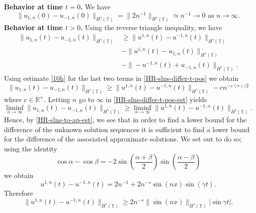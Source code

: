 \documentclass[12pt,reqno]{amsart}
\newcommand{\rr}{\mathbb{R}}
\newcommand{\ci}{\mathbb{T}}
\newcommand{\ee}{\varepsilon}
\theoremstyle{plain}  %
\theoremstyle{definition}
\begin{document}
%
%
%  
%
\vskip0.1in
{\bf Behavior at time $t=0$.}  We have
%
%
\begin{equation} 
	\label{HR-slns-differ-t-0} 
	\|
	u_{1, n}(0)
	-
	u_{-1, n}(0)
	\|_{H^s(\ci)}
	=
	\|
	2   n^{-1}
	\|_{H^s(\ci)}
	\simeq
	n^{-1}
	\longrightarrow 
	0
	\,\,
	\text{as}
	\,\,
	n \to \infty.
\end{equation}
%
%
%  
%
\vskip0.1in
{\bf Behavior at time  $t>0$.}  Using the reverse triangle inequality, we 
have
%
%
%
\begin{equation} 
	\label{HR-slns-differ-t-pos}
	\begin{split}
		\|
		u_{1, n}(t)
		-
		u_{- 1, n}(t)
		\|_{H^s(\ci)}
		&
		\ge
		\|
		u^{1, n}(t)
		-
		u^{- 1, n}(t)
		\|_{H^s(\ci)}
		\\
		&
		-
		\|
		u^{1, n}(t)
		-
		u_{1, n}(t)
		\|_{H^s(\ci)}
		\\
		&
		-
		\|
		-u^{-1, n}(t)
		+
		u_{-1, n}(t)
		\|_{H^s(\ci)} .
	\end{split}
\end{equation}
%
%
Using estimate \eqref{10h} for the last two terms 
in \eqref{HR-slns-differ-t-pos} we obtain
%
%
%
\begin{equation} 
	\label{HR-slns-differ-t-pos-est}
	\|
	u_{1, n}(t)
	-
	u_{- 1, n}(t)
	\|_{H^s(\ci)}
	\ge
	\|
	u^{1, n}(t)
	-
	u^{- 1, n}(t)
	\|_{H^s(\ci)}
	-
	c n^{- \ee(s)/2}
\end{equation}
where $c \in \rr^+$. Letting $n$ go to $\infty$ in
\eqref{HR-slns-differ-t-pos-est}
yields
%
\begin{equation} 
	\label{HR-slns-to-ap-est}
	\liminf_{n\to\infty}
	\|
	u_{1, n}(t)
	-
	u_{- 1, n}(t)
	\|_{H^s(\ci)}
	\ge
	\liminf_{n\to\infty}
	\|
	u^{1, n}(t)
	-
	u^{- 1, n}(t)
	\|_{H^s(\ci)}.
\end{equation}
%
%
Hence, by \eqref{HR-slns-to-ap-est}, we see that in order to find a lower bound for
the difference of the unknown solution sequences it is
sufficient to find a lower bound for the difference of the
associated approximate solutions. We set out to do so; using the identity 
$$
\cos \alpha -\cos \beta
=
-2
\sin(\frac{\alpha + \beta}{2})
\sin(\frac{\alpha - \beta}{2})
$$
we obtain
$$
u^{1, n}(t)
-
u^{- 1, n}(t)
=
2
n^{-1}
+
2
n^{-  s}
\sin (n x) \sin (\gamma t).
$$
Therefore
%
%
\begin{equation} 
	\label{B--ap-below-est-1}
	\|
	u^{1, n}(t)
	-
	u^{- 1, n}(t)
	\|_{H^s(\ci)}
	\ge
	2
	n^{  -  s}
	\|
	\sin (n x)
	\|_{H^s(\ci)}
	|\sin \gamma t|.
\end{equation}
\end{document}
